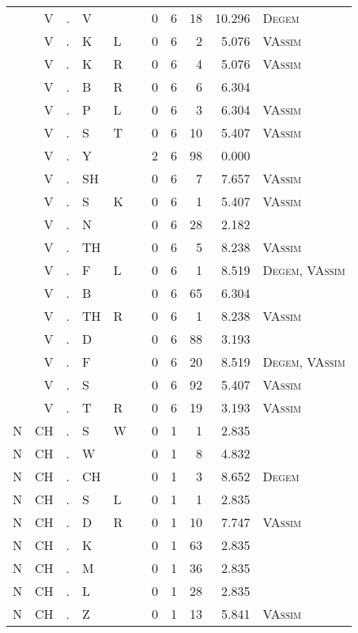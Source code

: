 \begin{longtable}{r@{ } r@{ } c@{ } l@{ } l@{ } l@{ } r r r r l }
 & V & . & V &  &  & 0 & 6 & 18 & 10.296 & \textsc{Degem} \\
 & V & . & K & L &  & 0 & 6 & 2 & 5.076 & \textsc{VAssim} \\
 & V & . & K & R &  & 0 & 6 & 4 & 5.076 & \textsc{VAssim} \\
 & V & . & B & R &  & 0 & 6 & 6 & 6.304 &  \\
 & V & . & P & L &  & 0 & 6 & 3 & 6.304 & \textsc{VAssim} \\
 & V & . & S & T &  & 0 & 6 & 10 & 5.407 & \textsc{VAssim} \\
 & V & . & Y &  &  & 2 & 6 & 98 & 0.000 &  \\
 & V & . & SH &  &  & 0 & 6 & 7 & 7.657 & \textsc{VAssim} \\
 & V & . & S & K &  & 0 & 6 & 1 & 5.407 & \textsc{VAssim} \\
 & V & . & N &  &  & 0 & 6 & 28 & 2.182 &  \\
 & V & . & TH &  &  & 0 & 6 & 5 & 8.238 & \textsc{VAssim} \\
 & V & . & F & L &  & 0 & 6 & 1 & 8.519 & \textsc{Degem}, \textsc{VAssim} \\
 & V & . & B &  &  & 0 & 6 & 65 & 6.304 &  \\
 & V & . & TH & R &  & 0 & 6 & 1 & 8.238 & \textsc{VAssim} \\
 & V & . & D &  &  & 0 & 6 & 88 & 3.193 &  \\
 & V & . & F &  &  & 0 & 6 & 20 & 8.519 & \textsc{Degem}, \textsc{VAssim} \\
 & V & . & S &  &  & 0 & 6 & 92 & 5.407 & \textsc{VAssim} \\
 & V & . & T & R &  & 0 & 6 & 19 & 3.193 & \textsc{VAssim} \\
N & CH & . & S & W &  & 0 & 1 & 1 & 2.835 &  \\
N & CH & . & W &  &  & 0 & 1 & 8 & 4.832 &  \\
N & CH & . & CH &  &  & 0 & 1 & 3 & 8.652 & \textsc{Degem} \\
N & CH & . & S & L &  & 0 & 1 & 1 & 2.835 &  \\
N & CH & . & D & R &  & 0 & 1 & 10 & 7.747 & \textsc{VAssim} \\
N & CH & . & K &  &  & 0 & 1 & 63 & 2.835 &  \\
N & CH & . & M &  &  & 0 & 1 & 36 & 2.835 &  \\
N & CH & . & L &  &  & 0 & 1 & 28 & 2.835 &  \\
N & CH & . & Z &  &  & 0 & 1 & 13 & 5.841 & \textsc{VAssim} \\

\end{longtable}
